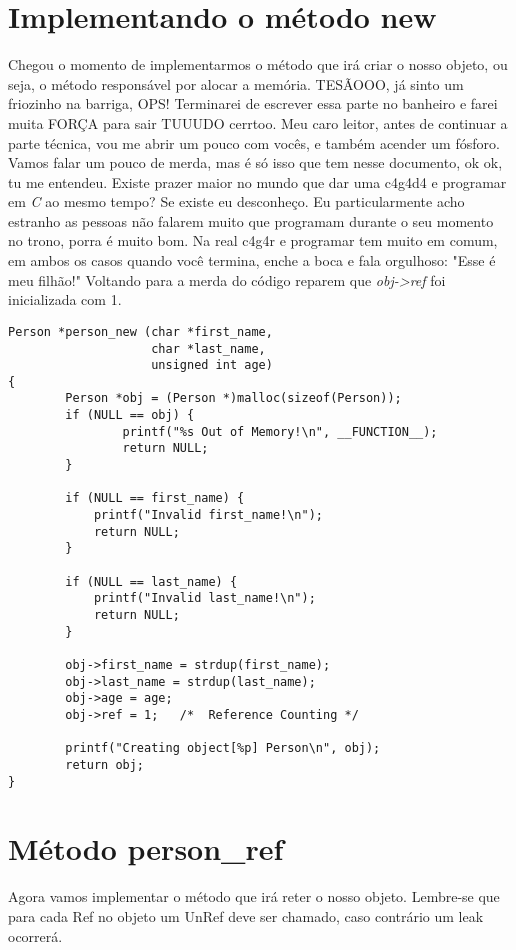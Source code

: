\section{Implementando o método new}

Chegou o momento de implementarmos o método que irá criar o nosso objeto, ou seja, o método responsável por alocar a memória. TESÃOOO, já sinto um friozinho na barriga, OPS!
Terminarei de escrever essa parte no banheiro e farei muita FORÇA para sair TUUUDO cerrtoo. Meu caro leitor, antes de continuar a parte técnica, vou me abrir um pouco com 
vocês, e também acender um fósforo. Vamos falar um pouco de merda, mas é só isso que tem nesse documento, ok ok, tu me entendeu. Existe prazer maior no mundo que dar uma 
c4g4d4 e programar em \textit{C} ao mesmo tempo? Se existe eu desconheço. Eu particularmente acho estranho as pessoas não falarem muito que programam durante o seu momento no
trono, porra é muito bom. Na real c4g4r e programar tem muito em comum, em ambos os casos quando você termina, enche a boca e fala orgulhoso: "Esse é meu filhão!" Voltando para a
merda do código reparem que \textit{obj->ref} foi inicializada com 1.

\belowcaptionskip=-10pt
\begin{lstlisting}[label=some-code,caption=person\_new()]
Person *person_new (char *first_name, 
                    char *last_name, 
                    unsigned int age)
{
        Person *obj = (Person *)malloc(sizeof(Person));
        if (NULL == obj) {
                printf("%s Out of Memory!\n", __FUNCTION__);
                return NULL;
        }

        if (NULL == first_name) {
            printf("Invalid first_name!\n");
            return NULL;
        }

        if (NULL == last_name) {
            printf("Invalid last_name!\n");
            return NULL;
        }

        obj->first_name = strdup(first_name);
        obj->last_name = strdup(last_name);
        obj->age = age;
        obj->ref = 1;   /*  Reference Counting */

        printf("Creating object[%p] Person\n", obj);
        return obj;
}

\end{lstlisting}

\vspace{50mm}

\section{Método person\_ref}
Agora vamos implementar o método que irá reter o nosso objeto. Lembre-se que para cada Ref no objeto um UnRef deve ser chamado, caso contrário um leak ocorrerá.

